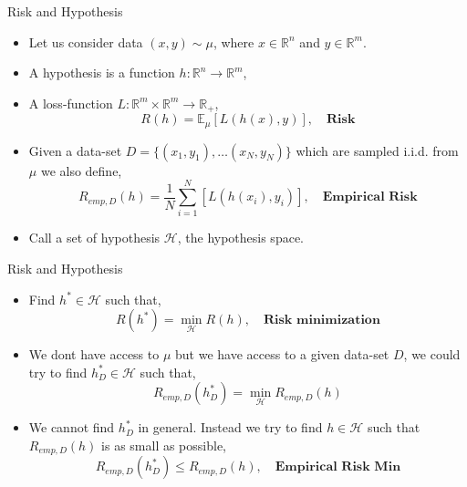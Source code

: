 \documentclass[10pt]{beamer}
\begin{document}
\begin{frame}{Risk and Hypothesis}
	\begin{itemize}
		\item Let us consider data $(x,y) \sim \mu$, where $x \in \mathbb{R}^n$ and $y \in \mathbb{R}^m$.
		\pause
		\item A hypothesis is a function $h: \mathbb{R}^n \to \mathbb{R}^m$,
		\pause
		\item A loss-function $L:\mathbb{R}^m \times \mathbb{R}^m \to \mathbb{R}_+$,
		$$R(h) = \mathbb{E}_{\mu}\left[L(h(x),y)\right], \quad \textbf{Risk}$$
		\pause
		\item Given a data-set $D = \{(x_1,y_1), \ldots (x_N,y_N)\}$ which are sampled i.i.d. from $\mu$ we also define,
 	    $$R_{emp,D} (h) = \frac{1}{N}\sum_{i=1}^N \left[L(h(x_i),y_i)\right], \quad \textbf{Empirical Risk}$$
		\pause
		\item Call a set of hypothesis $\mathcal{H}$, the hypothesis space.
	\end{itemize}
\end{frame}

\begin{frame}{Risk and Hypothesis}
	\begin{itemize}
		\item Find $h^\ast \in \mathcal{H}$ such that,
		$$R(h^\ast) = \min_{\mathcal{H}} R(h), \quad \textbf{Risk minimization}$$
		\pause
		\item We dont have access to $\mu$ but we have access to a given data-set $D$, we could try to find $h_D^\ast \in \mathcal{H}$ such that,
		$$R_{emp,D}(h_D^\ast) = \min_{\mathcal{H}} R_{emp,D}(h)$$
		\pause
		\item We cannot find $h_D^\ast$ in general. Instead we try to find $h \in \mathcal{H}$ such that $R_{emp,D}(h)$ is as small as possible,
		$$R_{emp,D}(h_D^\ast) \leq R_{emp,D}(h), \quad \textbf{Empirical Risk Min}$$
	\end{itemize}
\end{frame}
\end{document}
